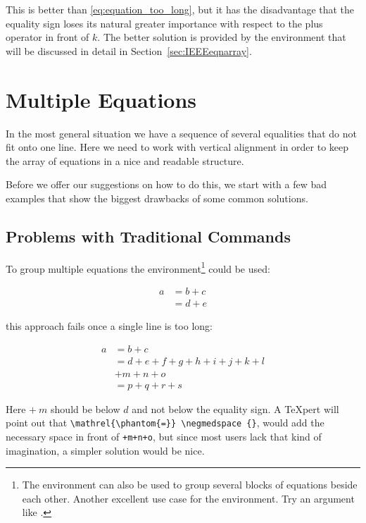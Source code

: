 This is better than \eqref{eq:equation_too_long}, but
it has the disadvantage that the equality sign loses its natural
greater importance with respect to the plus operator in front of
$k$. The better solution is provided by the
 environment that will be discussed in detail in
Section~\ref{sec:IEEEeqnarray}.

\section{Multiple Equations}
\label{sec:IEEEeqnarray}

In the most general situation we have a sequence of several
equalities that do not fit onto one line. Here we need to work with
vertical alignment in order to keep the array of equations in a nice
and readable structure.

Before we offer our suggestions on how to do this, we start with a few
bad examples that show the biggest drawbacks of some common solutions.


\subsection{Problems with Traditional Commands}
\label{sec:problems_traditional}

To group multiple equations the
 environment\footnote{The  environment can
  also be used to group several blocks of equations beside each other.
  Another excellent use case for the
   environment. Try an argument like
  .} could be used:
\begin{example}
\begin{align}
  a & = b + c \\
  & = d + e
\end{align}
\end{example}

this approach fails once a single line is too long:
\begin{example}
\begin{align}
  a & = b + c \\
  & = d + e + f + g + h + i 
  + j + k + l \nonumber \\
  & + m + n + o \\
  & = p + q + r + s
\end{align}
\end{example}
\noindent
Here $+\:m$ should be below $d$ and not below the equality sign. A
\TeX{}pert will point out that \verb+\mathrel{\phantom{=}} \negmedspace {}+,
would add the necessary space in front of \verb|+m+n+o|, but since most users
lack that kind of imagination, a simpler solution would be nice.

